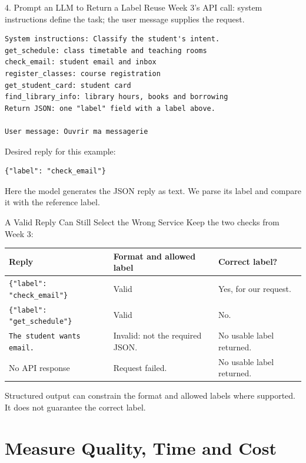 \documentclass[aspectratio=169]{beamer}
\begin{document}
\begin{frame}[fragile]{4. Prompt an LLM to Return a Label}
  \small Reuse Week 3's API call: system instructions define the task; the user message supplies the request.
\begin{lstlisting}
System instructions: Classify the student's intent.
get_schedule: class timetable and teaching rooms
check_email: student email and inbox
register_classes: course registration
get_student_card: student card
find_library_info: library hours, books and borrowing
Return JSON: one "label" field with a label above.

User message: Ouvrir ma messagerie
\end{lstlisting}
  \small Desired reply for this example:
\begin{lstlisting}
{"label": "check_email"}
\end{lstlisting}
  \small Here the model generates the JSON reply as text. We parse its label and compare it with the reference label.
\end{frame}

\begin{frame}{A Valid Reply Can Still Select the Wrong Service}
  \small Keep the two checks from Week 3:
  \par\vspace{0.5em}
  \renewcommand{\arraystretch}{1.4}
  \begin{tabular}{@{}p{5.0cm}p{3.4cm}p{3.9cm}@{}}
    \toprule
    \textbf{Reply} & \textbf{Format and allowed label} & \textbf{Correct label?} \\
    \midrule
    \texttt{\{"label": "check\_email"\}} & Valid & Yes, for our request. \\
    \texttt{\{"label": "get\_schedule"\}} & Valid & No. \\
    \texttt{The student wants email.} & Invalid: not the required JSON. & No usable label returned. \\
    No API response & Request failed. & No usable label returned. \\
    \bottomrule
  \end{tabular}
  \par\vspace{0.6em}
  \small Structured output can constrain the format and allowed labels where supported. It does not guarantee the correct label.
  \end{frame}

\section{Measure Quality, Time and Cost}
\end{document}
